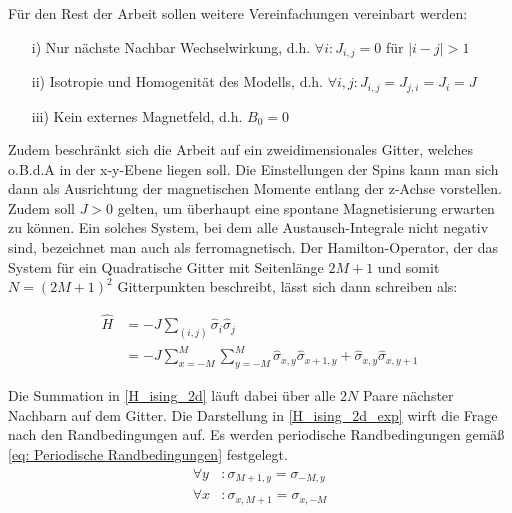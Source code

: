 \noindent Für den Rest der Arbeit sollen weitere Vereinfachungen vereinbart werden:
\begin{itemize}
\item[i)] Nur nächste Nachbar Wechselwirkung, d.h. $\forall i : J_{i,j} = 0$ für $\vert i-j \vert > 1$
\item[ii)] Isotropie und Homogenität des Modells, d.h. $ \forall i,j : J_{i,j} = J_{j,i} = J_i = J $
\item[iii)] Kein externes Magnetfeld, d.h. $B_0 = 0$
\end{itemize}

\noindent Zudem beschränkt sich die Arbeit auf ein zweidimensionales Gitter, welches o.B.d.A in der x-y-Ebene liegen soll. Die Einstellungen der Spins kann man sich dann als Ausrichtung der magnetischen Momente entlang der z-Achse vorstellen. Zudem soll $J > 0$ gelten, um überhaupt eine spontane Magnetisierung erwarten zu können. Ein solches System, bei dem alle Austausch-Integrale nicht negativ sind, bezeichnet man auch als ferromagnetisch. Der Hamilton-Operator, der das System für ein Quadratische Gitter mit Seitenlänge $2M+1$ und somit $N = (2M+1)^2$ Gitterpunkten beschreibt, lässt sich dann schreiben als:

\begin{grayframe}[frametitle = {2d Ising-Modell ohne externes Magnetfeld}]
\begin{align} 
\hat{H} &= - J  \sum_{(i,j)} \hat{\sigma}_i \hat{\sigma}_j \label{H_ising_2d}\\
  &= - J \sum_{x = -M}^M \sum_{y = -M}^M \hat{\sigma}_{x, y} \hat{\sigma}_{x+1, y} + \hat{\sigma}_{x, y} \hat{\sigma}_{x,y+1} \label{H_ising_2d_exp} 
\end{align}
\end{grayframe}

\noindent Die Summation in \eqref{H_ising_2d} läuft dabei über alle $2N$ Paare nächster Nachbarn auf dem Gitter. 
Die Darstellung in \eqref{H_ising_2d_exp} wirft die Frage nach den Randbedingungen auf. Es werden periodische Randbedingungen gemäß \eqref{eq: Periodische Randbedingungen} festgelegt. 
\begin{equation} \label{eq: Periodische Randbedingungen}
\begin{aligned} 
\forall y & : \sigma_{M+1, y} =  \sigma_{-M, y} \\
\forall x & : \sigma_{x, M+1} =  \sigma_{x, -M}
\end{aligned}
\end{equation}

